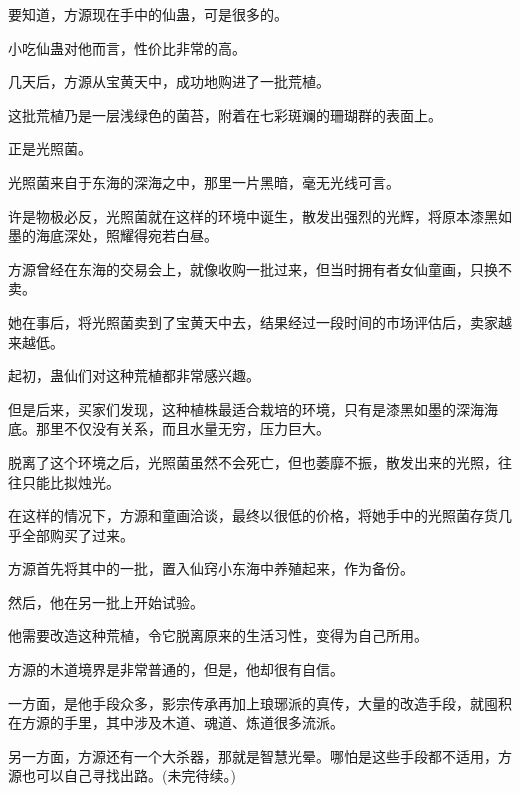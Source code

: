 \begin{this_body}
要知道，方源现在手中的仙蛊，可是很多的。

小吃仙蛊对他而言，性价比非常的高。

几天后，方源从宝黄天中，成功地购进了一批荒植。

这批荒植乃是一层浅绿色的菌苔，附着在七彩斑斓的珊瑚群的表面上。

正是光照菌。

光照菌来自于东海的深海之中，那里一片黑暗，毫无光线可言。

许是物极必反，光照菌就在这样的环境中诞生，散发出强烈的光辉，将原本漆黑如墨的海底深处，照耀得宛若白昼。

方源曾经在东海的交易会上，就像收购一批过来，但当时拥有者女仙童画，只换不卖。

她在事后，将光照菌卖到了宝黄天中去，结果经过一段时间的市场评估后，卖家越来越低。

起初，蛊仙们对这种荒植都非常感兴趣。

但是后来，买家们发现，这种植株最适合栽培的环境，只有是漆黑如墨的深海海底。那里不仅没有关系，而且水量无穷，压力巨大。

脱离了这个环境之后，光照菌虽然不会死亡，但也萎靡不振，散发出来的光照，往往只能比拟烛光。

在这样的情况下，方源和童画洽谈，最终以很低的价格，将她手中的光照菌存货几乎全部购买了过来。

方源首先将其中的一批，置入仙窍小东海中养殖起来，作为备份。

然后，他在另一批上开始试验。

他需要改造这种荒植，令它脱离原来的生活习性，变得为自己所用。

方源的木道境界是非常普通的，但是，他却很有自信。

一方面，是他手段众多，影宗传承再加上琅琊派的真传，大量的改造手段，就囤积在方源的手里，其中涉及木道、魂道、炼道很多流派。

另一方面，方源还有一个大杀器，那就是智慧光晕。哪怕是这些手段都不适用，方源也可以自己寻找出路。(未完待续。)

\end{this_body}

